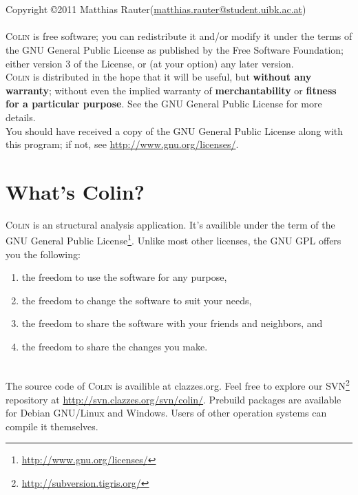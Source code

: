 \documentclass[a4paper,11pt]{report}
\newcommand{\Colin}[0]{\textsc{Colin }}
\begin{document}



\clearpage
\ \\
\vspace{470pt}
\ \\
Copyright \copyright 2011 Matthias Rauter(\href{mailto:matthias.rauter@student.uibk.ac.at}{matthias.rauter@student.uibk.ac.at})\\
\vspace{20pt} \ \\
\Colin is free software; you can redistribute it and/or modify it under the terms of the GNU General Public License as published by the Free Software Foundation; either version 3 of the License, or (at your option) any later version.\\
\Colin is distributed in the hope that it will be useful, but \textbf{without any warranty}; without even the implied warranty of \textbf{merchantability} or \textbf{fitness for a particular purpose}. See the GNU General Public License for more details.\\
You should have received a copy of the GNU General Public License along with this program; if not, see \url{http://www.gnu.org/licenses/}.


\clearpage

\tableofcontents


\clearpage
{}

\chapter{What's Colin?}
\label{cha:colin}

\Colin is an structural analysis application. It's availible under the term of the GNU General Public License\footnote{\url{http://www.gnu.org/licenses/}}. Unlike most other licenses, the GNU GPL offers you the following:
\begin{enumerate}
	\item [0] the freedom to use the software for any purpose,
	\item [1] the freedom to change the software to suit your needs,
	\item [2] the freedom to share the software with your friends and neighbors, and
	\item [3] the freedom to share the changes you make.
\end{enumerate}\\
The source code of \Colin is availible at clazzes.org. Feel free to explore our SVN\footnote{\url{http://subversion.tigris.org/}} repository at \url{http://svn.clazzes.org/svn/colin/}. Prebuild packages are available for Debian GNU/Linux and Windows. Users of other operation systems can compile it themselves.\\
\end{document}
